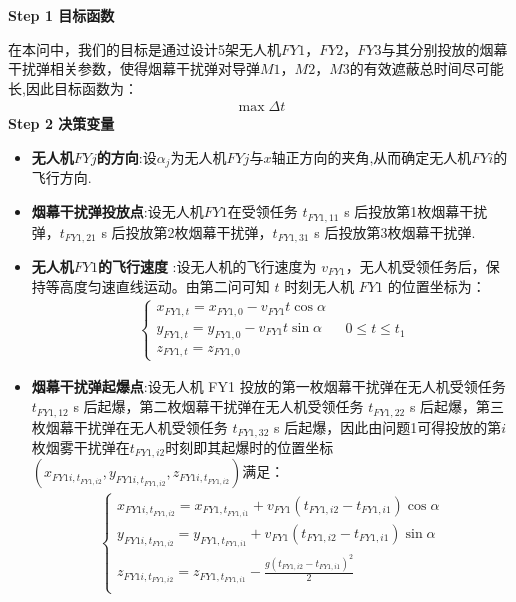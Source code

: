 \documentclass[../main.tex]{subfiles}
\begin{document}
\noindent \textbf{Step 1 目标函数}
\par 在本问中，我们的目标是通过设计5架无人机$FY1$，$FY2$，$FY3$与其分别投放的烟幕干扰弹相关参数，使得烟幕干扰弹对导弹$M1$，$M2$，$M3$的有效遮蔽总时间尽可能长,因此目标函数为：
\begin{align}\label{11.1}
  \max \Delta t
\end{align}
\noindent \textbf{Step 2 决策变量}

\begin{itemize}
\item \textbf{无人机$FYj$的方向}:设$\alpha_j$为无人机$FYj$与$x$轴正方向的夹角,从而确定无人机$FYi$的飞行方向.
\item \textbf{烟幕干扰弹投放点}:设无人机$FY1$在受领任务 \( t_{FY1,11} \) s 后投放第1枚烟幕干扰弹，\( t_{FY1,21} \) s 后投放第2枚烟幕干扰弹，\( t_{FY1,31} \) s 后投放第3枚烟幕干扰弹.
\item  \textbf{无人机$FY1$的飞行速度} :设无人机的飞行速度为 \( v_{FY1} \)，无人机受领任务后，保持等高度匀速直线运动。由第二问可知 \( t \) 时刻无人机 \( FY1 \) 的位置坐标为：
\begin{align}\label{11.3}
  \begin{cases}
x_{FY1,t} = x_{FY1,0} - v_{FY1} t \cos\alpha \\
y_{FY1,t} = y_{FY1,0} - v_{FY1} t \sin\alpha \\
z_{FY1,t} = z_{FY1,0}
\end{cases}
\quad 0 \leq t \leq t_1
\end{align}
\item \textbf{烟幕干扰弹起爆点}:设无人机 FY1 投放的第一枚烟幕干扰弹在无人机受领任务 \( t_{FY1,12} \) s 后起爆，第二枚烟幕干扰弹在无人机受领任务 \( t_{FY1,22} \) s 后起爆，第三枚烟幕干扰弹在无人机受领任务 \( t_{FY1,32} \) s 后起爆，因此由问题1可得投放的第$i$枚烟雾干扰弹在$t_{FY1,i2}$时刻即其起爆时的位置坐标$\left( x_{FY1i,t_{FY1,i2}},y_{FY1i,t_{FY1,i2}},z_{FY1i,t_{FY1,i2}} \right)$满足：
\begin{align}\label{11.4}
\left\{ \begin{array}{l}
	x_{FY1i,t_{FY1,i2}}=x_{FY1,t_{FY1,i1}}+v_{FY1}\left( t_{FY1,i2}-t_{FY1,i1} \right) \cos \alpha\\
	y_{FY1i,t_{FY1,i2}}=y_{FY1,t_{FY1,i1}}+v_{FY1}\left( t_{FY1,i2}-t_{FY1,i1} \right) \sin \alpha\\
	z_{FY1i,t_{FY1,i2}}=z_{FY1,t_{FY1,i1}}-\frac{g\left( t_{FY1,i2}-t_{FY1,i1} \right) ^2}{2}\\
\end{array} \right. 

\end{align}
\end{itemize}
\end{document}
